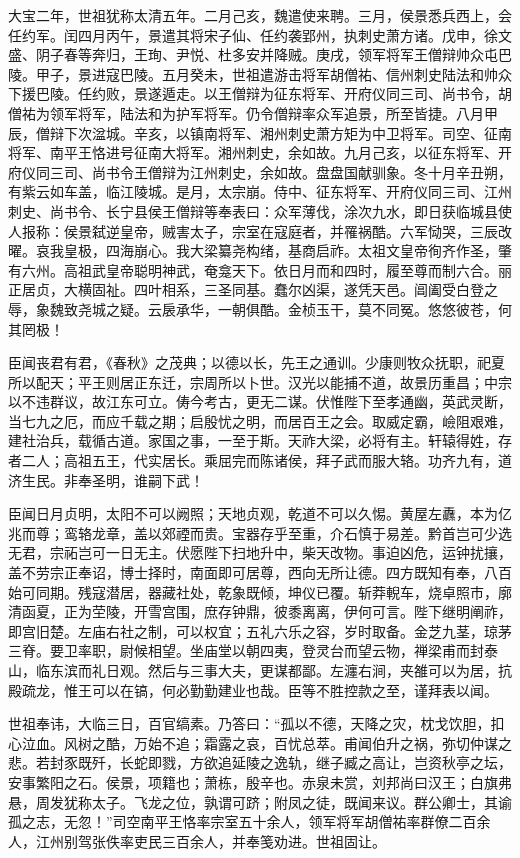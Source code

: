 \documentclass[12pt,UTF8]{ctexbook}
\begin{document}
大宝二年，世祖犹称太清五年。二月己亥，魏遣使来聘。三月，侯景悉兵西上，会任约军。闰四月丙午，景遣其将宋子仙、任约袭郢州，执刺史萧方诸。戊申，徐文盛、阴子春等奔归，王珣、尹悦、杜多安并降贼。庚戌，领军将军王僧辩帅众屯巴陵。甲子，景进寇巴陵。五月癸未，世祖遣游击将军胡僧祐、信州刺史陆法和帅众下援巴陵。任约败，景遂遁走。以王僧辩为征东将军、开府仪同三司、尚书令，胡僧祐为领军将军，陆法和为护军将军。仍令僧辩率众军追景，所至皆捷。八月甲辰，僧辩下次湓城。辛亥，以镇南将军、湘州刺史萧方矩为中卫将军。司空、征南将军、南平王恪进号征南大将军。湘州刺史，余如故。九月己亥，以征东将军、开府仪同三司、尚书令王僧辩为江州刺史，余如故。盘盘国献驯象。冬十月辛丑朔，有紫云如车盖，临江陵城。是月，太宗崩。侍中、征东将军、开府仪同三司、江州刺史、尚书令、长宁县侯王僧辩等奉表曰：众军薄伐，涂次九水，即日获临城县使人报称：侯景弑逆皇帝，贼害太子，宗室在寇庭者，并罹祸酷。六军恸哭，三辰改曜。哀我皇极，四海崩心。我大梁纂尧构绪，基商启祚。太祖文皇帝徇齐作圣，肇有六州。高祖武皇帝聪明神武，奄龛天下。依日月而和四时，履至尊而制六合。丽正居贞，大横固祉。四叶相系，三圣同基。蠢尔凶渠，遂凭天邑。阊阖受白登之辱，象魏致尧城之疑。云扆承华，一朝俱酷。金桢玉干，莫不同冤。悠悠彼苍，何其罔极！

臣闻丧君有君，《春秋》之茂典；以德以长，先王之通训。少康则牧众抚职，祀夏所以配天；平王则居正东迁，宗周所以卜世。汉光以能捕不道，故景历重昌；中宗以不违群议，故江东可立。俦今考古，更无二谋。伏惟陛下至孝通幽，英武灵断，当七九之厄，而应千载之期；启殷忧之明，而居百王之会。取威定霸，嶮阻艰难，建社治兵，载循古道。家国之事，一至于斯。天祚大梁，必将有主。轩辕得姓，存者二人；高祖五王，代实居长。乘屈完而陈诸侯，拜子武而服大辂。功齐九有，道济生民。非奉圣明，谁嗣下武！

臣闻日月贞明，太阳不可以阙照；天地贞观，乾道不可以久惕。黄屋左纛，本为亿兆而尊；鸾辂龙章，盖以郊禋而贵。宝器存乎至重，介石慎于易差。黔首岂可少选无君，宗祏岂可一日无主。伏愿陛下扫地升中，柴天改物。事迫凶危，运钟扰攘，盖不劳宗正奉诏，博士择时，南面即可居尊，西向无所让德。四方既知有奉，八百始可同期。残寇潜居，器藏社处，乾象既倾，坤仪已覆。斩莽輗车，烧卓照市，廓清函夏，正为茔陵，开雪宫围，庶存钟鼎，彼黍离离，伊何可言。陛下继明阐祚，即宫旧楚。左庙右社之制，可以权宜；五礼六乐之容，岁时取备。金芝九茎，琼茅三脊。要卫率职，尉候相望。坐庙堂以朝四夷，登灵台而望云物，禅梁甫而封泰山，临东滨而礼日观。然后与三事大夫，更谋都鄙。左瀍右涧，夹雒可以为居，抗殿疏龙，惟王可以在镐，何必勤勤建业也哉。臣等不胜控款之至，谨拜表以闻。

世祖奉讳，大临三日，百官缟素。乃答曰：“孤以不德，天降之灾，枕戈饮胆，扣心泣血。风树之酷，万始不追；霜露之哀，百忧总萃。甫闻伯升之祸，弥切仲谋之悲。若封豕既歼，长蛇即戮，方欲追延陵之逸轨，继子臧之高让，岂资秋亭之坛，安事繁阳之石。侯景，项籍也；萧栋，殷辛也。赤泉未赏，刘邦尚曰汉王；白旗弗悬，周发犹称太子。飞龙之位，孰谓可跻；附凤之徒，既闻来议。群公卿士，其谕孤之志，无忽！”司空南平王恪率宗室五十余人，领军将军胡僧祐率群僚二百余人，江州别驾张佚率吏民三百余人，并奉笺劝进。世祖固让。
\end{document}

